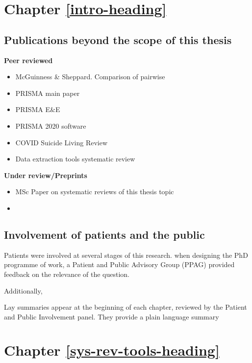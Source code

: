 \documentclass[a4paper, twoside]{templates/ociamthesis}
\begin{document}
\hypertarget{appendix-into}{%
\section{Chapter \ref{intro-heading}}\label{appendix-into}}

\hypertarget{appendix-publications}{%
\subsection{Publications beyond the scope of this thesis}\label{appendix-publications}}

\textbf{Peer reviewed}

\begin{itemize}
\item
  McGuinness \& Sheppard. Comparison of pairwise
\item
  PRISMA main paper
\item
  PRISMA E\&E
\item
  PRISMA 2020 software
\item
  COVID Suicide Living Review
\item
  Data extraction tools systematic review
\end{itemize}

\textbf{Under review/Preprints}

\begin{itemize}
\item
  MSc Paper on systematic reviews of this thesis topic
\item
\end{itemize}

\hypertarget{appendix-ppi}{%
\subsection{Involvement of patients and the public}\label{appendix-ppi}}

Patients were involved at several stages of this research. when designing the PhD programme of work, a Patient and Public Advisory Group (PPAG) provided feedback on the relevance of the question.

Additionally,

Lay summaries appear at the beginning of each chapter, reviewed by the Patient and Public Involvement panel. They provide a plain language summary

\hypertarget{appendix-sys-rev-tools}{%
\section{Chapter \ref{sys-rev-tools-heading}}\label{appendix-sys-rev-tools}}
\end{document}
